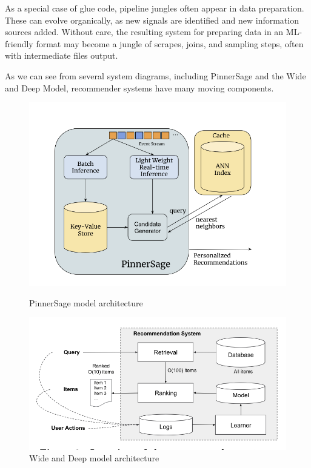 \documentclass[11pt, table]{diazessay} %
\begin{document}
\begin{sloppypar}
\leftskip=0.5in\bigskip\noindent
As a special case of glue code, pipeline jungles often appear in data preparation. These can evolve organically, as new signals are identified and new information sources added. Without care, the resulting system for preparing data in an ML-friendly format may become a jungle of scrapes, joins, and sampling steps, often with intermediate files output.
\leftskip=0pt\bigskip


As we can see from several system diagrams, including PinnerSage and the Wide and Deep Model, recommender systems have many moving components.


\begin{figure}[H]
  \centering
  \begin{minipage}[b]{0.4\textwidth}
    \includegraphics[width=\textwidth]{figures/pinnersage.png}
    \caption{PinnerSage model architecture\citep{pal2020pinnersage}}
  \end{minipage}
  \hfill
  \begin{minipage}[b]{0.4\textwidth}
    \includegraphics[width=\textwidth]{figures/wideanddeep_arch.png}
    \caption{Wide and Deep model architecture\citep{cheng2016wide}}
  \end{minipage}
\end{figure}


\end{sloppypar}
\end{document}
